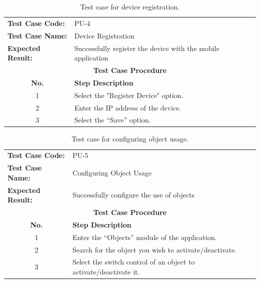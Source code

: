 \documentclass[a4paper,fleqn]{cas-sc}
\begin{document}
			\begin{table}[hbt!]
				\centering
				\caption{Test case for device registration.}
				\label{tab:device-registration-test-case}
				\begin{tabularx}{\textwidth}{l X}
					\toprule
					\textbf{Test Case Code:} & PU-4 \\
					\textbf{Test Case Name:} & Device Registration \\
					\textbf{Expected Result:} & Successfully register the device with the mobile application \\
					\midrule
					\multicolumn{2}{c}{\textbf{Test Case Procedure}} \\
					\midrule
					\multicolumn{1}{c}{\textbf{No.}} & \textbf{Step Description} \\
					\midrule
					\multicolumn{1}{c}{1} & Select the "Register Device" option. \\
					\multicolumn{1}{c}{2} & Enter the IP address of the device. \\
					\multicolumn{1}{c}{3} & Select the ``Save'' option. \\
					\bottomrule
				\end{tabularx}
			\end{table}
			
			\begin{table}[hbt!]
				\centering
				\caption{Test case for configuring object usage.}
				\label{tab:configure-object-usage-test-case}
				\begin{tabularx}{\textwidth}{l X}
					\toprule
					\textbf{Test Case Code:} & PU-5 \\
					\textbf{Test Case Name:} & Configuring Object Usage \\
					\textbf{Expected Result:} & Successfully configure the use of objects \\
					\midrule
					\multicolumn{2}{c}{\textbf{Test Case Procedure}} \\
					\midrule
					\multicolumn{1}{c}{\textbf{No.}} & \textbf{Step Description} \\
					\midrule
					\multicolumn{1}{c}{1} & Enter the ``Objects'' module of the application. \\
					\multicolumn{1}{c}{2} & Search for the object you wish to activate/deactivate. \\
					\multicolumn{1}{c}{3} & Select the switch control of an object to activate/deactivate it. \\
					\bottomrule
				\end{tabularx}
			\end{table}
\end{document}
